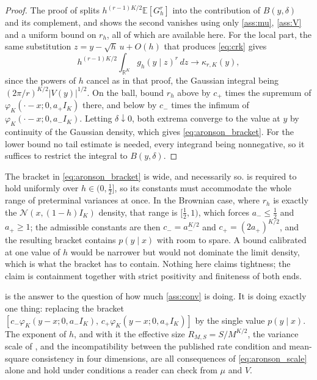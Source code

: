 \documentclass[11pt]{article}
\theoremstyle{definition}
\newcommand{\R}{\mathbb{R}}
\newcommand{\E}{\mathbb{E}}
\newcommand{\Normal}{\mathcal{N}}
\newcommand{\phik}{\varphi_K}
\begin{document}
\begin{proof}
The proof of  splits $h^{(r-1)K/2}\E[G_h^r]$ into the contribution of $B(y,\delta)$ and its complement, and shows the second vanishes using only \ref{ass:mu}, \ref{ass:V} and a uniform bound on $r_h$, all of which are available here. For the local part, the same substitution $z=y-\sqrt h\,u+O(h)$ that produces \eqref{eq:crk} gives
\[
h^{(r-1)K/2}\int_{\R^K}g_h(y\mid z)^r\,dz\longrightarrow\kappa_{r,K}(y),
\]
since the powers of $h$ cancel as in that proof, the Gaussian integral being $(2\pi/r)^{K/2}|V(y)|^{1/2}$. On the ball, bound $r_h$ above by $c_+$ times the supremum of $\phik(\cdot-x;0,a_+I_K)$ there, and below by $c_-$ times the infimum of $\phik(\cdot-x;0,a_-I_K)$. Letting $\delta\downarrow0$, both extrema converge to the value at $y$ by continuity of the Gaussian density, which gives \eqref{eq:aronson_bracket}. For the lower bound no tail estimate is needed, every integrand being nonnegative, so it suffices to restrict the integral to $B(y,\delta)$.
\end{proof}

The bracket in \eqref{eq:aronson_bracket} is wide, and necessarily so.  is required to hold uniformly over $h\in(0,\tfrac12]$, so its constants must accommodate the whole range of preterminal variances at once. In the Brownian case, where $r_h$ is exactly the $\Normal(x,(1-h)I_K)$ density, that range is $[\tfrac12,1)$, which forces $a_-\le\tfrac12$ and $a_+\ge1$; the admissible constants are then $c_-=a_-^{K/2}$ and $c_+=(2a_+)^{K/2}$, and the resulting bracket contains $p(y\mid x)$ with room to spare. A bound calibrated at one value of $h$ would be narrower but would not dominate the limit density, which is what the bracket has to contain. Nothing here claims tightness; the claim is containment together with strict positivity and finiteness of both ends.

 is the answer to the question of how much \ref{ass:conv} is doing. It is doing exactly one thing: replacing the bracket $[c_-\phik(y-x;0,a_-I_K),\,c_+\phik(y-x;0,a_+I_K)]$ by the single value $p(y\mid x)$. The exponent of $h$, and with it the effective size $R_{M,S}=S/M^{K/2}$, the variance scale of , and the incompatibility between the published rate condition and mean-square consistency in four dimensions, are all consequences of \eqref{eq:aronson_scale} alone and hold under conditions a reader can check from $\mu$ and $V$.
\end{document}
